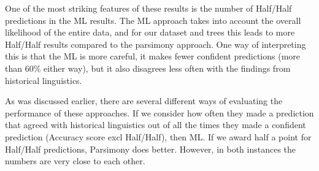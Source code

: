 \documentclass[draft,10pt]{article} %
\begin{document}



One of the most striking features of these results is the number of Half/Half predictions in the ML results. The ML approach takes into account the overall likelihood of the entire data, and for our dataset and trees this leads to more Half/Half results compared to the parsimony approach. One way of interpreting this is that the ML is more careful, it makes fewer confident predictions (more than 60\% either way), but it also disagrees less often with the findings from historical linguistics.

As was discussed earlier, there are several different ways of evaluating the performance of these approaches. If we consider how often they made a prediction that agreed with historical linguistics out of all the times they made a confident prediction (Accuracy score excl Half/Half), then ML. If we award half a point for Half/Half predictions, Parsimony does better. However, in both instances the numbers are very close to each other.


\end{document}
